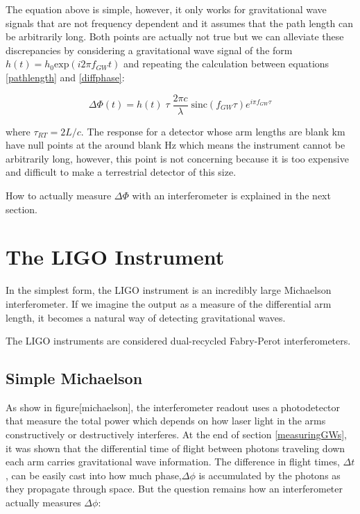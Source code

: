\documentclass[oneside]{book}
\begin{document}
	The equation above is simple, however, it only works for gravitational wave signals that are not frequency dependent and it assumes that the path length can be arbitrarily long. Both points are actually not true but we can alleviate these discrepancies by considering a gravitational wave signal of the form $h(t) = h_0 \text{exp} (i 2 \pi f_{GW} t)$  and repeating the calculation between equations \ref{pathlength} and \ref{diffphase}:
	
	\begin{equation}\label{gwsinc}
	\Delta \Phi (t) = h(t) \; \tau \; \frac{2 \pi c}{\lambda} \; \text{sinc}(f_{GW} \tau) e^{i \pi f_{GW} \tau}
	\end{equation}
	
	where $\tau_{RT} = 2L/c$.  The response for a detector whose arm lengths are blank km have null points at the around blank Hz which means the instrument cannot be arbitrarily long, however, this point is not concerning because it is too expensive and difficult to make a terrestrial detector of this size.
	
	How to actually measure $\Delta \Phi$ with an interferometer is explained in the next section.
	
	
	
	\section{The LIGO Instrument}
	In the simplest form, the LIGO instrument is an incredibly large Michaelson interferometer.  If we imagine the output as a measure of the differential arm length, it becomes a natural way of detecting gravitational waves.
	
	The LIGO instruments are considered dual-recycled Fabry-Perot interferometers.
	
		\subsection{Simple Michaelson}
		As show in figure[michaelson], the interferometer readout uses a photodetector that measure the total power which depends on how laser light in the arms constructively or destructively interferes.  
		At the end of section \ref{measuringGWs}, it was shown that the differential time of flight between photons traveling down each arm carries gravitational wave information.  The difference in flight times, $\Delta t$, can be easily cast into how much phase,$\Delta \phi$ is accumulated by the photons as they propagate through space.  But the question remains how an interferometer actually measures $\Delta \phi$:
		
\end{document}

